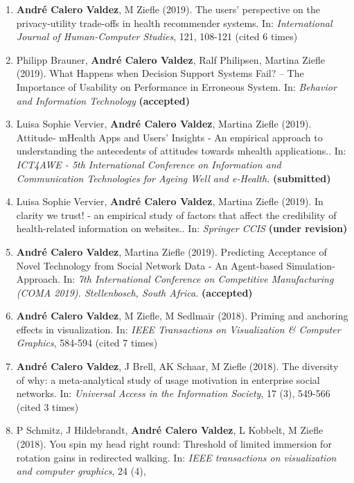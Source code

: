 \documentclass[11pt,a4paper,sans]{moderncv}
\providecommand{\tightlist}{%
	\setlength{\itemsep}{0pt}\setlength{\parskip}{0pt}}
\begin{document}
\begin{enumerate}
\def\labelenumi{\arabic{enumi}.}
\tightlist
\item
  \textbf{André Calero Valdez}, M Ziefle (2019). The users' perspective
  on the privacy-utility trade-offs in health recommender systems. In:
  \emph{International Journal of Human-Computer Studies}, 121, 108-121
  (cited 6 times)
\item
  Philipp Brauner, \textbf{André Calero Valdez}, Ralf Philipsen, Martina
  Ziefle (2019). What Happens when Decision Support Systems Fail? -- The
  Importance of Usability on Performance in Erroneous System. In:
  \emph{Behavior and Information Technology} \textbf{(accepted)}
\item
  Luisa Sophie Vervier, \textbf{André Calero Valdez}, Martina Ziefle
  (2019). Attitude- mHealth Apps and Users' Insights - An empirical
  approach to understanding the antecedents of attitudes towards mhealth
  applications.. In: \emph{ICT4AWE - 5th International Conference on
  Information and Communication Technologies for Ageing Well and
  e-Health.} \textbf{(submitted)}
\item
  Luisa Sophie Vervier, \textbf{André Calero Valdez}, Martina Ziefle
  (2019). In clarity we trust! - an empirical study of factors that
  affect the credibility of health-related information on websites.. In:
  \emph{Springer CCIS} \textbf{(under revision)}
\item
  \textbf{André Calero Valdez}, Martina Ziefle (2019). Predicting
  Acceptance of Novel Technology from Social Network Data - An
  Agent-based Simulation-Approach. In: \emph{7th International
  Conference on Competitive Manufacturing (COMA 2019). Stellenbosch,
  South Africa.} \textbf{(accepted)}
\item
  \textbf{André Calero Valdez}, M Ziefle, M Sedlmair (2018). Priming and
  anchoring effects in visualization. In: \emph{IEEE Transactions on
  Visualization \& Computer Graphics}, 584-594 (cited 7 times)
\item
  \textbf{André Calero Valdez}, J Brell, AK Schaar, M Ziefle (2018). The
  diversity of why: a meta-analytical study of usage motivation in
  enterprise social networks. In: \emph{Universal Access in the
  Information Society}, 17 (3), 549-566 (cited 3 times)
\item
  P Schmitz, J Hildebrandt, \textbf{André Calero Valdez}, L Kobbelt, M
  Ziefle (2018). You spin my head right round: Threshold of limited
  immersion for rotation gains in redirected walking. In: \emph{IEEE
  transactions on visualization and computer graphics}, 24 (4),

\end{enumerate}
\end{document}
